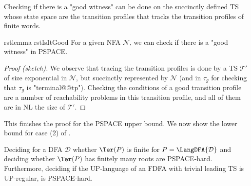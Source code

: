 \documentclass[a4paper,USenglish,cleveref,autoref,thm-restate]{lipics-v2021}
\newcommand{\mc}[1]{\ensuremath{\mathcal{#1}}}
\newcommand{\T}{\mc{T}}
\newcommand{\N}{\mc{N}}
\newcommand{\D}{\mc{D}}
\newcommand{\PSPACE}{\textsf{PSPACE}\xspace}
\begin{document}
Checking if there is a "good witness" can be done on the succinctly defined TS whose state space are the transition profiles that tracks the transition profiles of finite words.

\begin{restatable}{rstlemma}
  {rstIsItGood}
  \label{lem:InPSPACE}
  For a given NFA $\N$, we can check if there is a "good witness" in \PSPACE.
\end{restatable}

\begin{proof}[Proof (sketch)]
  We observe that tracing the transition profiles is done by a TS $\T'$ of size exponential in $\N$, but succinctly represented by $\N$ (and in $\tau_g$ for checking that $\tau_g$ is "terminal@@tp").
  Checking the conditions of a good transition profile are a number of reachability problems in this transition profile, and all of them are in NL the size of $\T'$.
\end{proof}






\iffalse
  \begin{restatable}{rstlemma}{rstdifferent}
    \label{lem:different}
    If $x,y$ are different words of equal length $\ell=|x|=|y|$ and $p>2\ell$ is a prime number, then $x \cdot y^{p-1}$ is a root.

    Moreover, if $\tau$ is a "rejecting" transition profile and both $\tpN(x)$ and $\tpN(y)$ are powers of $\tau$, then $\tpN(x\cdot y^{p-1})$ is "rejecting" and $x\cdot y^{p-1} \notin \Pow{P}$.
  \end{restatable}

  \begin{proof}[Proof (sketch)]
    If $u$ is a shorter root with $|u|<p\cdot\ell$, then either $r=|u|$ divides $\ell$, in which case $x=y=u^{\ell/r}$ holds, or $p$ divides $r$, but then $x$ is repeated after $r$ letters, $y$ after $r+\ell$ letters, and they must be the same shift of $y$ and thus equal. \hfill (contradiction)

    For the second part, being a power of $\tau$ is closed under powers and concatenation.
  \end{proof}
\fi

This finishes the proof for the \PSPACE upper bound. We now show the lower bound for case (2) of .


\begin{theorem} \label{thm:regularity-hard}
  Deciding for a DFA $\D$ whether $\Ter(P)$ is finite for $P=\LangDFA{\D}$ and deciding whether $\Ter(P)$ has finitely many roots are \PSPACE-hard. Furthermore, deciding if the UP-language of an FDFA with trivial leading TS is UP-regular, is \PSPACE-hard.
\end{theorem}
\end{document}
